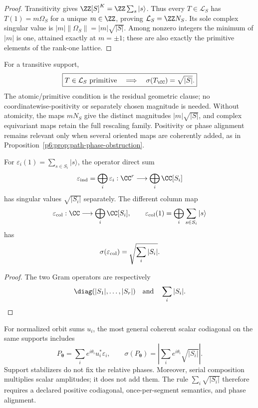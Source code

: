 \documentclass[12pt,a4paper]{article}
\begin{document}
\begin{proof}
Transitivity gives
\(
\ZZ[S]^K=\ZZ\sum_s|s\rangle
\).
Thus every \(T\in\mathcal L_S\) has
\(T(1)=m\Omega_S\) for a unique \(m\in\ZZ\), proving
\(\mathcal L_S=\ZZ N_S\).  Its sole complex singular value is
\(|m|\|\Omega_S\|=|m|\sqrt{|S|}\).  Among nonzero integers the minimum of
\(|m|\) is one, attained exactly at \(m=\pm1\); these are also exactly the
primitive elements of the rank-one lattice.
\end{proof}

\begin{corollary}
\label{p6:cor:tmf-radical-firewall}
For a transitive support,
\[
\boxed{
T\in\mathcal L_S\text{ primitive}
\quad\Longrightarrow\quad
\sigma(T_\CC)=\sqrt{|S|}.
}
\]
The atomic/primitive condition is the residual geometric clause; no
coordinatewise-positivity or separately chosen magnitude is needed.  Without
atomicity, the maps \(mN_S\) give the distinct magnitudes
\(|m|\sqrt{|S|}\), and complex equivariant maps retain the full rescaling
family.  Positivity or phase alignment remains relevant only when several
oriented maps are coherently added, as in
Proposition~\ref{p6:prop:path-phase-obstruction}.
\end{corollary}

\begin{proposition}
\label{p6:prop:common-domain-correction}
For
\(
\varepsilon_i(1)=\sum_{s\in S_i}|s\rangle
\),
the operator direct sum
\[
\varepsilon_{\rm ind}=\bigoplus_i\varepsilon_i:
\CC^r\longrightarrow\bigoplus_i\CC[S_i]
\]
has singular values \(\sqrt{|S_i|}\) separately.  The different column map
\[
\varepsilon_{\rm col}:\CC\longrightarrow\bigoplus_i\CC[S_i],
\qquad
\varepsilon_{\rm col}(1)
=\bigoplus_i\sum_{s\in S_i}|s\rangle
\]
has
\[
\sigma(\varepsilon_{\rm col})
=\sqrt{\sum_i|S_i|}.
\]
\end{proposition}

\begin{proof}
The two Gram operators are respectively
\[
\diag(|S_1|,\ldots,|S_r|)
\quad\text{and}\quad
\sum_i|S_i|.
\]
\end{proof}

\begin{proposition}
\label{p6:prop:path-phase-obstruction}
For normalized orbit sums \(u_i\), the most general coherent scalar
codiagonal on the same supports includes
\[
P_{\boldsymbol\theta}
=\sum_i e^{i\theta_i}u_i^*\varepsilon_i,
\qquad
\sigma(P_{\boldsymbol\theta})
=\left|\sum_i e^{i\theta_i}\sqrt{|S_i|}\right|.
\]
Support stabilizers do not fix the relative phases.  Moreover, serial
composition multiplies scalar amplitudes; it does not add them.  The rule
\(\sum_i\sqrt{|S_i|}\) therefore requires a declared positive codiagonal,
once-per-segment semantics, and phase alignment.
\end{proposition}
\end{document}
